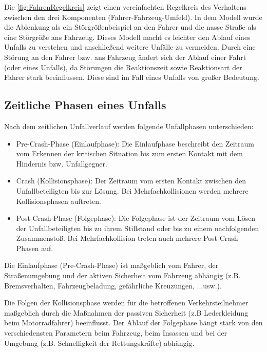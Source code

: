 Die \autoref{fig:FahrenRegelkreis} zeigt einen vereinfachten Regelkreis des Verhaltens zwischen den drei Komponenten (Fahrer-Fahrzeug-Umfeld). In dem Modell wurde die Ablenkung als ein Störgrößenbeispiel an den Fahrer und die nasse Straße als eine Störgröße ans Fahrzeug. Dieses Modell macht es leichter den Ablauf eines Unfalls zu verstehen und anschließend weitere Unfälle zu vermeiden. Durch eine Störung an den Fahrer bzw. ans Fahrzeug ändert sich der Ablauf einer Fahrt (oder eines Unfalls), da Störungen die Reaktionszeit sowie Reaktionsart der Fahrer stark beeinflussen. Diese sind im Fall eines Unfalls von großer Bedeutung. \\


%
\subsection{Zeitliche Phasen eines Unfalls}

Nach dem zeitlichen Unfallverlauf werden folgende Unfallphasen unterschieden:
\begin{itemize}
	\item Pre-Crash-Phase (Einlaufphase): 
	Die Einlaufphase beschreibt den Zeitraum vom Erkennen der kritischen Situation bis zum ersten Kontakt mit dem Hindernis bzw. Unfallgegner.
	\item Crash (Kollisionsphase):
	Der Zeitraum vom ersten Kontakt zwischen den Unfallbeteiligten bis zur Lösung. Bei Mehrfachkollisionen werden mehrere Kollisionsphasen auftreten.
	\item Post-Crash-Phase (Folgephase):
	Die Folgephase ist der Zeitraum vom Lösen der Unfallbeteiligten bis zu ihrem Stillstand oder bis zu einem nachfolgenden Zusammenstoß. Bei Mehrfachkollision treten auch mehrere Post-Crash-Phasen auf. 
	
\end{itemize}
Die Einlaufphase (Pre-Crash-Phase) ist maßgeblich vom Fahrer, der Straßenumgebung und der aktiven Sicherheit vom Fahrzeug abhängig (z.B. Bremsverhalten, Fahrzeugbeladung, gefährliche Kreuzungen, ...usw.).
 
Die Folgen der Kollisionsphase werden für die betroffenen Verkehrsteilnehmer maßgeblich durch die Maßnahmen der passiven Sicherheit (z.B Lederkleidung beim Motorradfahrer) beeinflusst. Der Ablauf der Folgephase hängt stark von den verschiedensten Parametern beim Fahrzeug, beim Insassen und bei der Umgebung (z.B. Schnelligkeit der Rettungskräfte) abhängig.\cite{Appel2002}\\


